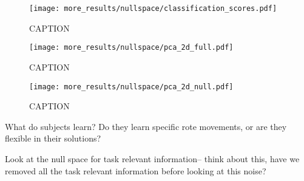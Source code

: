 \documentclass[../main.tex]{subfiles}
\begin{document}
\begin{figure}[H]
  \centering
    \texttt{[image: more\_results/nullspace/classification\_scores.pdf]}
    \caption[classification scores]{CAPTION}\label{fig:classification_scores}
\end{figure}

\begin{figure}[H]
  \centering
    \texttt{[image: more\_results/nullspace/pca\_2d\_full.pdf]}
    \caption[pca 2d full]{CAPTION}\label{fig:pca_2d_full}
\end{figure}

\begin{figure}[H]
  \centering
    \texttt{[image: more\_results/nullspace/pca\_2d\_null.pdf]}
    \caption[pca 2d null]{CAPTION}\label{fig:pca_2d_null}
\end{figure}


What do subjects learn? Do they learn specific rote movements, or are they flexible in their solutions?

Look at the null space for task relevant information-- think about this, have we removed all the task relevant information before looking at this noise?








\end{document}
